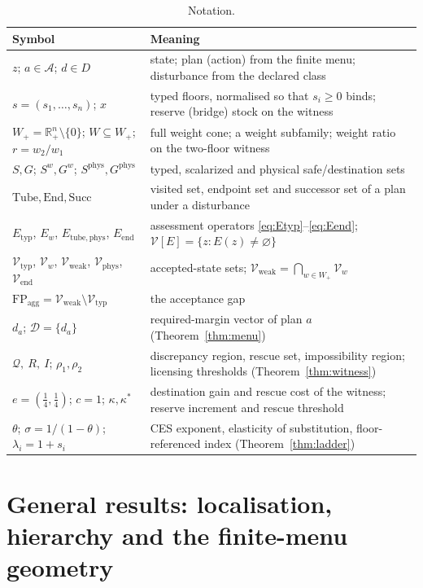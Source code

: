\documentclass[preprint,11pt,authoryear]{elsarticle}
\theoremstyle{definition}
\theoremstyle{remark}
\newcommand{\Etyp}{E_{\mathrm{typ}}}
\newcommand{\Eend}{E_{\mathrm{end}}}
\newcommand{\Ephys}{E_{\mathrm{tube,phys}}}
\newcommand{\Vtyp}{\mathcal{V}_{\mathrm{typ}}}
\newcommand{\Vweak}{\mathcal{V}_{\mathrm{weak}}}
\newcommand{\Vphys}{\mathcal{V}_{\mathrm{phys}}}
\newcommand{\Vend}{\mathcal{V}_{\mathrm{end}}}
\newcommand{\Wp}{W_+}
\newcommand{\FP}{\mathrm{FP}_{\mathrm{agg}}}
\newcommand{\Tube}{\mathrm{Tube}}
\newcommand{\Succ}{\mathrm{Succ}}
\newcommand{\End}{\mathrm{End}}
\newcommand{\Rp}{\mathbb{R}^n_+}
\newcommand{\Q}{\mathcal{Q}}
\begin{document}
\begin{table}[!htbp]
\centering\small
\caption{Notation.}
\label{tab:notation}
\begin{tabularx}{\textwidth}{@{}>{\raggedright\arraybackslash}p{}X@{}}
\toprule
Symbol & Meaning \\
\midrule
$z$; $a\in\mathcal A$; $d\in D$ & state; plan (action) from the finite menu; disturbance from the declared class \\
$s=(s_1,\dots,s_n)$; $x$ & typed floors, normalised so that $s_i\ge0$ binds; reserve (bridge) stock on the witness \\
$\Wp=\Rp\setminus\{0\}$; $W\subseteq\Wp$; $r=w_2/w_1$ & full weight cone; a weight subfamily; weight ratio on the two-floor witness \\
$S,G$; $S^w,G^w$; $S^{\mathrm{phys}},G^{\mathrm{phys}}$ & typed, scalarized and physical safe/destination sets \\
$\Tube,\End,\Succ$ & visited set, endpoint set and successor set of a plan under a disturbance \\
$\Etyp$, $E_w$, $\Ephys$, $\Eend$ & assessment operators \eqref{eq:Etyp}--\eqref{eq:Eend}; $\mathcal V[E]=\{z:E(z)\ne\varnothing\}$ \\
$\Vtyp$, $\mathcal V_w$, $\Vweak$, $\Vphys$, $\Vend$ & accepted-state sets; $\Vweak=\bigcap_{w\in\Wp}\mathcal V_w$ \\
$\FP=\Vweak\setminus\Vtyp$ & the acceptance gap \\
$d_a$; $\mathcal D=\{d_a\}$ & required-margin vector of plan $a$ (Theorem~\ref{thm:menu}) \\
$\Q,\ R,\ I$; $\rho_1,\rho_2$ & discrepancy region, rescue set, impossibility region; licensing thresholds (Theorem~\ref{thm:witness}) \\
$e=(\tfrac14,\tfrac14)$; $c=1$; $\kappa,\kappa^*$ & destination gain and rescue cost of the witness; reserve increment and rescue threshold \\
$\theta$; $\sigma=1/(1-\theta)$; $\lambda_i=1+s_i$ & CES exponent, elasticity of substitution, floor-referenced index (Theorem~\ref{thm:ladder}) \\
\bottomrule
\end{tabularx}
\end{table}

\section{General results: localisation, hierarchy and the finite-menu geometry}\label{sec:general}
\end{document}
